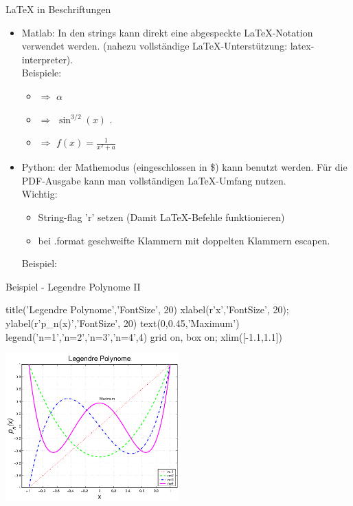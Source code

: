 \documentclass[hyperref={xetex}]{beamer}
\begin{document}
\begin{frame}[fragile]{\LaTeX{} in Beschriftungen}
\begin{itemize}
  \item  \alert{Matlab:} In den strings kann direkt eine abgespeckte \LaTeX-Notation verwendet werden. (nahezu vollständige 
\LaTeX-Unterstützung: latex-interpreter). \\
Beispiele: 
\begin{itemize} \item \imatlab{\\alpha} $\Rightarrow$ $\alpha$
\item {} $\Rightarrow$ $\sin^{3/2}(x)$ .
\item {}
$\Rightarrow$ $f(x) = \frac{1}{x^2+a}$
\end{itemize}
\item \alert{Python:} der Mathemodus (eingeschlossen in \$) kann benutzt werden. Für die PDF-Ausgabe kann man vollständigen \LaTeX-Umfang nutzen. \\
  \alert{Wichtig}: 
  \begin{itemize}
    \item String-flag 'r' setzen (Damit \LaTeX-Befehle funktionieren) 
      \item bei .format geschweifte Klammern mit doppelten Klammern escapen. 
  \end{itemize}
Beispiel: \\ 
\end{itemize}
\end{frame}
% 
% 
\begin{frame}[fragile]{Beispiel - Legendre Polynome II}
\begin{matlabin}[basicstyle=\scriptsize]
title('Legendre Polynome','FontSize', 20)
xlabel(r'x','FontSize', 20); ylabel(r'p_n(x)','FontSize', 20)
text(0,0.45,'Maximum')
legend('n=1','n=2','n=3','n=4',4)
grid on, box on;
xlim([-1.1,1.1])
\end{matlabin}
\hfil\includegraphics[width=0.5\textwidth]{figures/grafik_5}\hfil
\end{frame}
\end{document}
